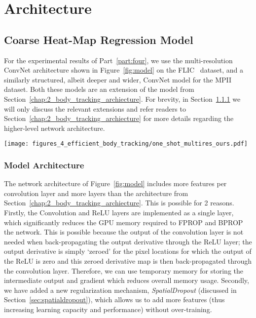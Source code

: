 \chapter{Architecture\label{chap:4_efficient_body_tracking_archiecture}}

\section{Coarse Heat-Map Regression Model}

For the experimental results of Part~\ref{part:four}, we use the multi-resolution ConvNet architecture shown in Figure~\ref{fig:model} on the FLIC~\cite{modec} dataset, and a similarly structured, albeit deeper and wider, ConvNet model for the MPII~\cite{andriluka14cvpr} dataset. Both these models are an extension of the model from Section~\ref{chap:2_body_tracking_archiecture}. For brevity, in Section~\ref{sec:heatmapmodel} we will only discuss the relevant extensions and refer readers to Section~\ref{chap:2_body_tracking_archiecture} for more details regarding the higher-level network architecture.

\begin{figure*}[ht]
\centering
\texttt{[image: figures\_4\_efficient\_body\_tracking/one\_shot\_multires\_ours.pdf]}
   \caption{Multi-resolution Sliding Window Detector With Overlapping Contexts (model used on FLIC dataset)}
\label{fig:model}
\end{figure*}

\subsection{Model Architecture}
\label{sec:heatmapmodel}

The network architecture of Figure~\ref{fig:model} includes more features per convolution layer and more layers than the architecture from Section~\ref{chap:2_body_tracking_archiecture}.  This is possible for 2 reasons. Firstly, the Convolution and ReLU layers are implemented as a single layer, which significantly reduces the GPU memory required to FPROP and BPROP the network.  This is possible because the output of the convolution layer is not needed when back-propagating the output derivative through the ReLU layer; the output derivative is simply `zeroed' for the pixel locations for which the output of the ReLU is zero and this zeroed derivative map is then back-propagated through the convolution layer. Therefore, we can use temporary memory for storing the intermediate output and gradient which reduces overall memory usage.  Secondly, we have added a new regularization mechanism, \textit{SpatialDropout} (discussed in Section~\ref{sec:spatialdropout}), which allows us to add more features (thus increasing learning capacity and performance) without over-training.

